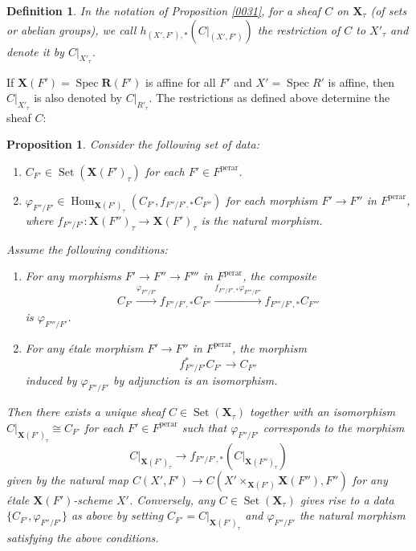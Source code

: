 \documentclass{amsart}
\newtheorem{Prop}[Thm]{Proposition}
\newtheorem{Def}[Thm]{Definition}
\theoremstyle{remark}
\numberwithin{equation}{subsection}
\newcommand{\perar}{\mathrm{perar}}
\newcommand{\alg}[1]{\mathbf{#1}}
\DeclareMathOperator{\Hom}{Hom}
\DeclareMathOperator{\Spec}{Spec}
\DeclareMathOperator{\Set}{Set}
\begin{document}
\begin{Def} \label{0161}
	In the notation of Proposition \ref{0031},
	for a sheaf $C$ on $\alg{X}_{\tau}$
	(of sets or abelian groups),
	we call $h_{(X', F'), \ast}(C|_{(X', F')})$ the \emph{restriction of $C$ to $X'_{\tau}$}
	and denote it by $C|_{X'_{\tau}}$.
\end{Def}

If $\alg{X}(F') = \Spec \alg{R}(F')$ is affine for all $F'$
and $X' = \Spec R'$ is affine,
then $C|_{X'_{\tau}}$ is also denoted by $C|_{R'_{\tau}}$.
The restrictions as defined above determine the sheaf $C$:

\begin{Prop} \label{0032}
	Consider the following set of data:
		\begin{enumerate}
			\item \label{0162}
				$C_{F'} \in \Set(\alg{X}(F')_{\tau})$ for each $F' \in F^{\perar}$.
			\item \label{0163}
				$\varphi_{F'' / F'} \in \Hom_{\alg{X}(F')_{\tau}}(C_{F'}, f_{F'' / F', \ast} C_{F''})$
				for each morphism $F' \to F''$ in $F^{\perar}$,
				where $f_{F'' / F'} \colon \alg{X}(F'')_{\tau} \to \alg{X}(F')_{\tau}$
				is the natural morphism.
		\end{enumerate}
	Assume the following conditions:
		\begin{enumerate}
			\item \label{0164}
				For any morphisms $F' \to F'' \to F'''$ in $F^{\perar}$, the composite
					\[
							C_{F'}
						\xrightarrow{\varphi_{F'' / F'}}
							f_{F'' / F', \ast} C_{F''}
						\xrightarrow{f_{F'' / F', \ast} \varphi_{F''' / F''}}
							f_{F''' / F', \ast} C_{F'''}
					\]
				is $\varphi_{F''' / F'}$.
			\item \label{0165}
				For any \'etale morphism $F' \to F''$ in $F^{\perar}$,
				the morphism
					\[
						f_{F'' / F'}^{\ast} C_{F'} \to C_{F''}
					\]
				induced by $\varphi_{F'' / F'}$ by adjunction is an isomorphism.
		\end{enumerate}
	Then there exists a unique sheaf $C \in \Set(\alg{X}_{\tau})$
	together with an isomorphism $C|_{\alg{X}(F')_{\tau}} \cong C_{F'}$ for each $F' \in F^{\perar}$
	such that $\varphi_{F'' / F'}$ corresponds to the morphism
		\[
				C|_{\alg{X}(F')_{\tau}}
			\to
				f_{F'' / F', \ast} (C|_{\alg{X}(F'')_{\tau}})
		\]
	given by the natural map $C(X', F') \to C(X' \times_{\alg{X}(F')} \alg{X}(F''), F'')$
	for any \'etale $\alg{X}(F')$-scheme $X'$.
	Conversely, any $C \in \Set(\alg{X}_{\tau})$ gives rise to
	a data $\{C_{F'}, \varphi_{F'' / F'}\}$ as above by setting
	$C_{F'} = C|_{\alg{X}(F')_{\tau}}$ and
	$\varphi_{F'' / F'}$ the natural morphism
	satisfying the above conditions.
\end{Prop}
\end{document}
